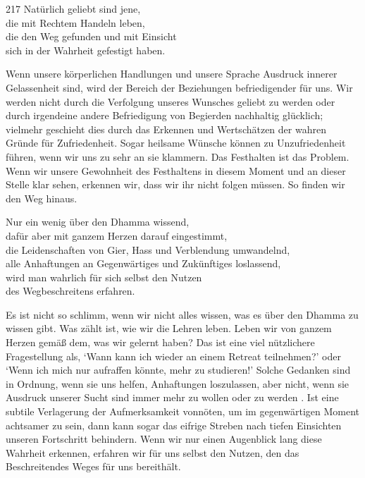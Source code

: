 
\begin{dhpVerse}{217}
\label{dhp-217}
Natürlich geliebt sind jene,\\ 
die mit Rechtem Handeln leben,\\ 
die den Weg gefunden und mit Einsicht\\ 
sich in der Wahrheit gefestigt haben. 
\end{dhpVerse}

\begin{dhpRefl}

Wenn unsere körperlichen Handlungen und unsere Sprache Ausdruck innerer
Gelassenheit sind, wird der Bereich der Beziehungen befriedigender für uns.
Wir werden nicht durch die Verfolgung unseres Wunsches geliebt zu werden oder
durch irgendeine andere Befriedigung von Begierden nachhaltig glücklich;
vielmehr geschieht dies durch das Erkennen und Wertschätzen der wahren Gründe
für Zufriedenheit. Sogar heilsame Wünsche können zu Unzufriedenheit führen,
wenn wir uns zu sehr an sie klammern. Das Festhalten ist das Problem. Wenn wir
unsere Gewohnheit des Festhaltens in diesem Moment und an dieser Stelle klar
sehen, erkennen wir, dass wir ihr nicht folgen müssen. So finden wir den Weg
hinaus.

\end{dhpRefl}


\begin{dhpVerse}{20}
\label{dhp-20}
Nur ein wenig über den Dhamma wissend,\\ 
dafür aber mit ganzem Herzen darauf eingestimmt,\\ 
die Leidenschaften von Gier, Hass und Verblendung umwandelnd,\\ 
alle Anhaftungen an Gegenwärtiges und Zukünftiges loslassend,\\ 
wird man wahrlich für sich selbst den Nutzen\\ 
des Wegbeschreitens erfahren. 
\end{dhpVerse}

\begin{dhpRefl}

Es ist nicht so schlimm, wenn wir nicht alles wissen, was es über den Dhamma
zu wissen gibt. Was zählt ist, wie wir die Lehren leben. Leben wir von ganzem
Herzen gemäß dem, was wir gelernt haben? Das ist eine viel nützlichere
Fragestellung als, `Wann kann ich wieder an einem Retreat teilnehmen?’ oder
`Wenn ich mich nur aufraffen könnte, mehr zu studieren!’ Solche Gedanken sind
in Ordnung, wenn sie uns helfen, Anhaftungen loszulassen, aber nicht, wenn sie
Ausdruck unserer Sucht sind immer mehr zu wollen oder zu werden . Ist eine
subtile Verlagerung der Aufmerksamkeit vonnöten, um im gegenwärtigen Moment
achtsamer zu sein, dann kann sogar das eifrige Streben nach tiefen Einsichten
unseren Fortschritt behindern. Wenn wir nur einen Augenblick lang diese
Wahrheit erkennen, erfahren wir für uns selbst den Nutzen, den das
Beschreitendes Weges für uns bereithält.

\end{dhpRefl}


